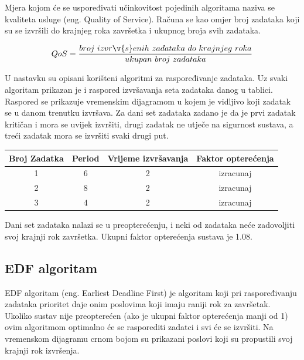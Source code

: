 \documentclass[../zavrsni.tex]{subfiles}
\begin{document}
Mjera kojom će se uspoređivati učinkovitost pojedinih algoritama naziva se kvaliteta usluge (eng. Quality of Service).
Računa se kao omjer broj zadataka koji su se izvršili do krajnjeg roka završetka i ukupnog broja svih zadataka.

\begin{equation*}
    QoS = \frac{broj\ izvr\v{s}enih\ zadataka\ do\ krajnjeg\ roka}{ukupan\ broj\ zadataka}
\end{equation*}

U nastavku su opisani korišteni algoritmi za raspoređivanje zadataka. 
Uz svaki algoritam prikazan je i raspored izvršavanja seta zadataka danog u tablici. Raspored se prikazuje vremenskim dijagramom u kojem
je vidljivo koji zadatak se u danom trenutku izvršava. 
Za dani set zadataka zadano je da je prvi
zadatak kritičan i mora se uvijek izvršiti, drugi zadatak ne utječe na sigurnost sustava, a treći zadatak mora se izvršiti svaki drugi put.

\begin{center}
    \begin{tabular}{||c || c c c||} 
     \hline
     Broj Zadatka & Period & Vrijeme izvršavanja & Faktor opterećenja \\ [0.5ex] 
     \hline\hline
     1 & 6 & 2 & izracunaj \\ 
     \hline
     2 & 8 & 2 & izracunaj \\
     \hline
     3 & 4 & 2 & izracunaj \\
     \hline
    \end{tabular}
    \end{center}

Dani set zadataka nalazi se u preopterećenju, i neki od zadataka neće zadovoljiti svoj krajnji rok završetka. Ukupni faktor opterećenja
sustava je 1.08.

\subsection{EDF algoritam}

EDF algoritam (eng. Earliest Deadline First) je algoritam koji pri raspoređivanju zadataka prioritet daje onim poslovima 
koji imaju raniji rok za završetak. Ukoliko sustav nije preopterećen (ako je ukupni faktor opterećenja manji od 1) 
ovim algoritmom optimalno će se rasporediti zadatci i svi će se izvršiti. Na vremenskom dijagramu crnom bojom su prikazani 
poslovi koji su propustili svoj krajnji rok izvršenja.
\end{document}
